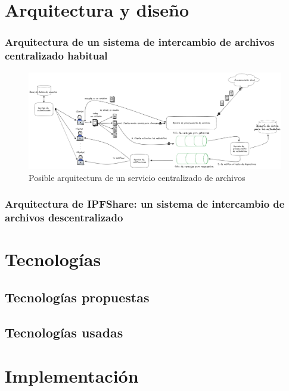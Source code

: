 \section{Arquitectura y diseño}
\subsubsection{Arquitectura de un sistema de intercambio de archivos centralizado habitual}

\begin{figure}
  \centering
  \includegraphics[width=\textwidth]{images/diagramacentral.png}
  \caption{Posible arquitectura de un servicio centralizado de archivos}
\end{figure}


\subsubsection{Arquitectura de IPFShare: un sistema de intercambio de archivos descentralizado}

\section{Tecnologías}
\subsection{Tecnologías propuestas}
\subsection{Tecnologías usadas}


\section{Implementación}


